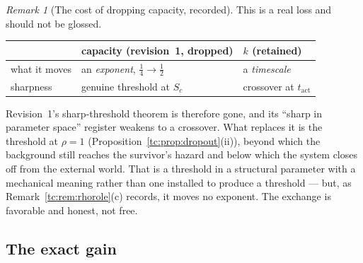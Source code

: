 \documentclass[11pt]{article}
\numberwithin{equation}{section}
\theoremstyle{plain}
\theoremstyle{definition}
\theoremstyle{remark}
\newtheorem{remark}[theorem]{Remark}
\begin{document}
\begin{remark}[The cost of dropping capacity, recorded]
\label{tc:rem:cost}
This is a real loss and should not be glossed.
\begin{center}\small
\begin{tabular}{@{}lll@{}}
\toprule
& capacity (revision~1, dropped) & $k$ (retained)\\
\midrule
what it moves & an \emph{exponent}, $\tfrac14\to\tfrac12$ &
a \emph{timescale}\\
sharpness & genuine threshold at $S_c$ & crossover at
$t_{\mathrm{act}}$\\
\bottomrule
\end{tabular}
\end{center}
Revision~1's sharp-threshold theorem is therefore gone, and its ``sharp
in parameter space'' register weakens to a crossover. What replaces it
is the threshold at $\rho=1$
(Proposition~\ref{tc:prop:dropout}(ii)), beyond which the background
still reaches the survivor's hazard and below which the system closes
off from the external world. That is a threshold in a structural
parameter with a mechanical meaning rather than one installed to produce
a threshold --- but, as Remark~\ref{tc:rem:rhorole}(c) records, it moves
no exponent. The exchange is favorable and honest, not free.
\end{remark}

\subsection{The exact gain}\label{tc:subsub:gain}
\end{document}
